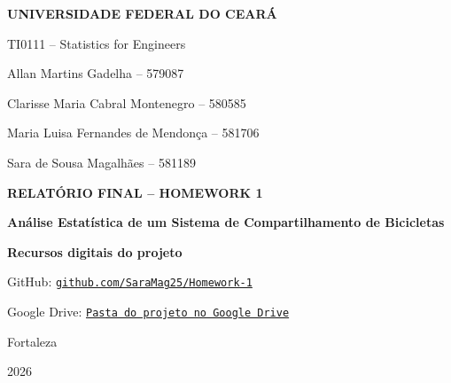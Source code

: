 \documentclass[12pt,oneside,a4paper,english,brazil]{abntex2}
\begin{document}
\pretextual
\pagestyle{empty}

\begin{capa}
\begin{center}
{\large\bfseries UNIVERSIDADE FEDERAL DO CEARÁ\par}
\vspace{0.25cm}
{\large TI0111 -- Statistics for Engineers\par}

\vspace{2.8cm}
{\large Allan Martins Gadelha -- 579087\par}
{\large Clarisse Maria Cabral Montenegro -- 580585\par}
{\large Maria Luisa Fernandes de Mendonça -- 581706\par}
{\large Sara de Sousa Magalhães -- 581189\par}

\vfill
{\Large\bfseries RELATÓRIO FINAL -- HOMEWORK 1\par}
\vspace{0.35cm}
{\large\bfseries Análise Estatística de um Sistema de Compartilhamento de Bicicletas\par}

\vfill
{\small\bfseries\color{lilasescuro} Recursos digitais do projeto\par}
\vspace{0.15cm}
{\small GitHub: \href{https://github.com/SaraMag25/Homework-1}{\texttt{github.com/SaraMag25/Homework-1}}\par}
{\small Google Drive: \href{https://drive.google.com/drive/folders/1jq3fmuYgX59cN8P8pv3AWH5V_lezF6Zc?usp=drive_link}{\texttt{Pasta do projeto no Google Drive}}\par}

\vfill
{\large Fortaleza\par}
{\large 2026\par}
\end{center}
\end{capa}
\end{document}
